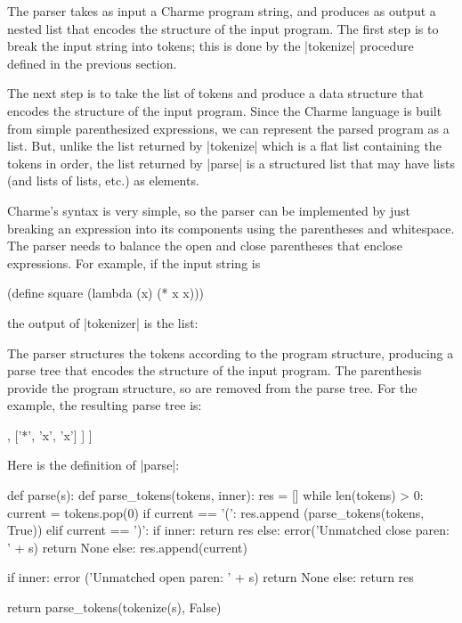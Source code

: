 The parser takes as input a Charme program string, and produces as output a nested list that encodes the structure of the input program. The first step is to break the input string into tokens; this is done by the \pycode|tokenize| procedure defined in the previous section.  

The next step is to take the list of tokens and produce a data structure that encodes the structure of the input program.  Since the Charme language is built from simple parenthesized expressions, we can represent the parsed program as a list.  But, unlike the list returned by \pycode|tokenize| which is a flat list containing the tokens in order, the list returned by \pycode|parse| is a structured list that may have lists (and lists of lists, etc.) as elements.  

Charme's syntax is very simple, so the parser can be implemented by just breaking an expression into its components using the parentheses and whitespace.  The parser needs to balance the open and close parentheses that enclose expressions.  For example, if the input string is 
\begin{schemedisplay}
(define square (lambda (x) (* x x)))
\end{schemedisplay}
the output of \pycode|tokenizer| is the list:
\begin{pythoncode}
\end{pythoncode}
The parser structures the tokens according to the program structure, producing a parse tree that encodes the structure of the input program.  The parenthesis provide the program structure, so are removed from the parse tree.  For the example, the resulting parse tree is:
\begin{pythoncode}
['define', 
 'square', 
 [  'lambda', 
    ['x'], 
    ['*', 'x', 'x'] ] ]
\end{pythoncode}
Here is the definition of \pycode|parse|:
\begin{pythoncode}
def parse(s):
    def parse_tokens(tokens, inner):
       res = []
       while len(tokens) > 0:
          current = tokens.pop(0)
          if current == '(':
             res.append (parse_tokens(tokens, True))
          elif current == ')':
             if inner: return res
             else:
                error('Unmatched close paren: ' + s)
                return None
          else: 
             res.append(current)
        
       if inner:
          error ('Unmatched open paren: ' + s)
          return None
       else:
          return res

    return parse_tokens(tokenize(s), False)
\end{pythoncode}

